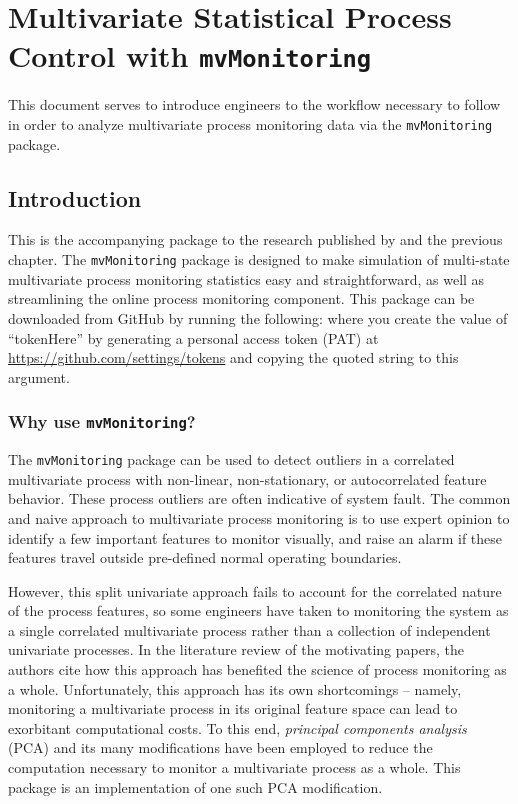 \documentclass{report}\usepackage[]{graphicx}\usepackage[]{color}
\begin{document}
\chapter{Multivariate Statistical Process Control with \texttt{mvMonitoring}}

This document serves to introduce engineers to the workflow necessary to follow in order to analyze multivariate process monitoring data via the \texttt{mvMonitoring} package.



\section{Introduction} \label{sec:intro}

This is the accompanying package to the research published by \cite{kazor_comparison_2016} and the previous chapter. The \texttt{mvMonitoring} package is designed to make simulation of multi-state multivariate process monitoring statistics easy and straightforward, as well as streamlining the online process monitoring component. This package can be downloaded from GitHub by running the following:
\noindent where you create the value of ``tokenHere'' by generating a personal access token (PAT) at \url{https://github.com/settings/tokens} and copying the quoted string to this argument.


\subsection{Why use \texttt{mvMonitoring}?}
The \texttt{mvMonitoring} package can be used to detect outliers in a correlated multivariate process with non-linear, non-stationary, or autocorrelated feature behavior. These process outliers are often indicative of system fault. The common  and naive approach to multivariate process monitoring is to use expert opinion to identify a few important features to monitor visually, and raise an alarm if these features travel outside pre-defined normal operating boundaries.

However, this split univariate approach fails to account for the correlated nature of the process features, so some engineers have taken to monitoring the system as a single correlated multivariate process rather than a collection of independent univariate processes. In the literature review of the motivating papers, the authors cite how this approach has benefited the science of process monitoring as a whole. Unfortunately, this approach has its own shortcomings -- namely, monitoring a multivariate process in its original feature space can lead to exorbitant computational costs. To this end, \emph{principal components analysis} (PCA) and its many modifications have been employed to reduce the computation necessary to monitor a multivariate process as a whole. This package is an implementation of one such PCA modification.
\end{document}

